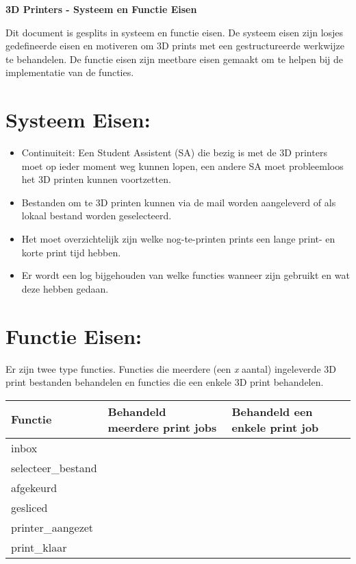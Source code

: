 \documentclass{article}
\newcommand{\cmark}{\textcolor{green}{\ding{51}}}%
\newcommand{\xmark}{\textcolor{red}{\ding{55}}}%
\begin{document}
\pagestyle{empty}

\begin{center}
  \Large \textbf{3D Printers - Systeem en Functie Eisen}
\end{center}

\noindent Dit document is gesplits in systeem en functie eisen. De systeem eisen zijn losjes gedefineerde eisen en motiveren om 3D prints met een gestructureerde werkwijze te behandelen. De functie eisen zijn meetbare eisen gemaakt om te helpen bij de implementatie van de functies.\\

\section*{Systeem Eisen:}
\begin{itemize}
  \item Continuiteit: Een Student Assistent (SA) die bezig is met de 3D printers moet op ieder moment weg kunnen lopen, een andere SA moet probleemloos het 3D printen kunnen voortzetten.
  \item Bestanden om te 3D printen kunnen via de mail worden aangeleverd of als lokaal bestand worden geselecteerd.
  \item Het moet overzichtelijk zijn welke nog-te-printen prints een lange print- en korte print tijd hebben.
  \item Er wordt een log bijgehouden van welke functies wanneer zijn gebruikt en wat deze hebben gedaan. 
\end{itemize}

\section*{Functie Eisen:}
Er zijn twee type functies. Functies die meerdere (een \textit{x} aantal) ingeleverde 3D print bestanden behandelen en functies die een enkele 3D print behandelen. 

\begin{table}[H]
    \centering
    \begin{tabular}%
    {>{\raggedright\arraybackslash}p{}%
    |>{\centering\arraybackslash}p{}
    |>{\centering\arraybackslash}p{}}
    \rowcolor{myblue} Functie & Behandeld meerdere print jobs & Behandeld een enkele print job\\\hline
    inbox &\cmark&\xmark\\
    selecteer\_bestand&\xmark&\cmark\\
    afgekeurd &\xmark&\cmark\\
    gesliced &\xmark&\cmark\\
    printer\_aangezet &\xmark&\cmark\\
    print\_klaar &\xmark&\cmark\\
  \end{tabular}
\end{table}
\end{document}
